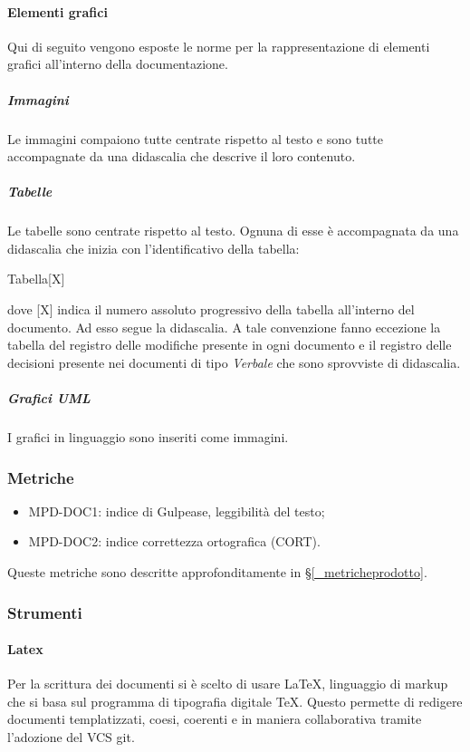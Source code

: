 \paragraph{Elementi grafici}
Qui di seguito vengono esposte le norme per la rappresentazione di elementi grafici all'interno della documentazione.

\subparagraph{Immagini}
Le immagini compaiono tutte centrate rispetto al testo e sono tutte accompagnate da una didascalia che descrive il loro contenuto.

\subparagraph{Tabelle}
Le tabelle sono centrate rispetto al testo. Ognuna di esse è accompagnata da una didascalia che inizia con l'identificativo della tabella:
\begin{center}
    Tabella[X]
\end{center}
dove [X] indica il numero assoluto progressivo della tabella all'interno del documento. Ad esso segue la  didascalia.  A tale convenzione fanno eccezione la tabella del registro delle modifiche presente in ogni documento e il registro delle decisioni presente nei documenti di tipo \textit{Verbale} che sono sprovviste di didascalia.

\subparagraph{Grafici UML}
I grafici in linguaggio  sono inseriti come immagini.

\subsubsection{Metriche}
\begin{itemize}
    \item MPD-DOC1: indice di Gulpease, leggibilità del testo;
    \item MPD-DOC2: indice correttezza ortografica (CORT).
\end{itemize}
Queste metriche sono descritte approfonditamente in \S\ref{_metricheprodotto}.

\subsubsection{Strumenti}
\paragraph{Latex}
Per la scrittura dei documenti si è scelto di usare \LaTeX, linguaggio di markup che si basa sul programma di tipografia digitale \TeX . Questo permette di redigere documenti templatizzati, coesi, coerenti e in maniera collaborativa tramite l'adozione del VCS git.

